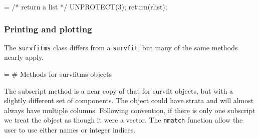 \documentclass{article}
\newcommand{\code}[1]{\texttt{#1}}
\begin{document}
\begin{nwchunk}
=
 /* return a list */
 UNPROTECT(3);
 return(rlist);
\end{nwchunk}
\subsubsection{Printing and plotting}
The \code{survfitms} class differs from a \code{survfit}, but many of the
same methods nearly apply.
\begin{nwchunk}
=
 # Methods for survfitms objects
\end{nwchunk}

The subscript method is a near copy of that for survfit
objects, but with a slightly different set of components.
The object could have strata and will almost always have multiple
columns. Following convention, if there is only one subscript we treat
the object as though it were a vector.
The \code{nmatch} function allow the user to use either names
or integer indices.
\end{document}

